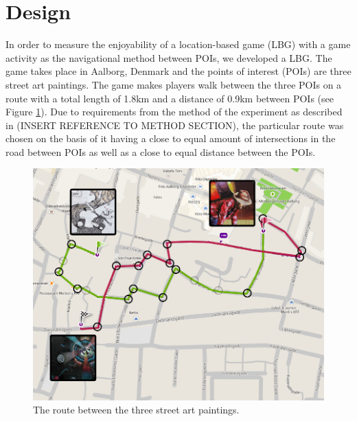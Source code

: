 \section{Design}

In order to measure the enjoyability of a location-based game (LBG) with a game activity as the navigational method between POIs, we developed a LBG. The game takes place in Aalborg, Denmark and the points of interest (POIs) are three street art paintings\cite{streetart}. The game makes players walk between the three POIs on a route with a total length of 1.8km and a distance of 0.9km between POIs (see Figure \ref{FinalRoute}). Due to requirements from the method of the experiment as described in (INSERT REFERENCE TO METHOD SECTION), the particular route was chosen on the basis of it having a close to equal amount of intersections in the road between POIs as well as a close to equal distance between the POIs.

\begin{figure}[hbtp]
\centering
\includegraphics[scale=0.2]{Pics/FinalRoute.png}
\caption{The route between the three street art paintings.}
\label{FinalRoute}
\end{figure}

